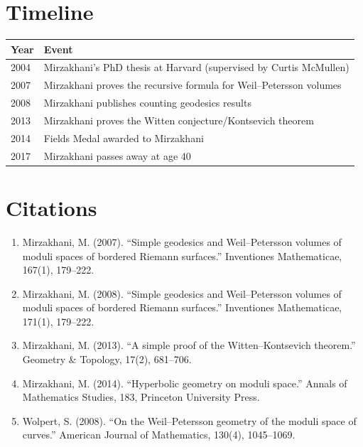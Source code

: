\section{Timeline}

\begin{tabularx}{\linewidth}{lX}
\toprule
\textbf{Year} & \textbf{Event} \\ \midrule
2004 & Mirzakhani's PhD thesis at Harvard (supervised by Curtis McMullen) \\ 
2007 & Mirzakhani proves the recursive formula for Weil--Petersson volumes \cite{mirzakhani2007} \\ 
2008 & Mirzakhani publishes counting geodesics results \cite{mirzakhani2008} \\ 
2013 & Mirzakhani proves the Witten conjecture/Kontsevich theorem \cite{mirzakhani2013} \\ 
2014 & Fields Medal awarded to Mirzakhani \\ 
2017 & Mirzakhani passes away at age 40 \\ \bottomrule
\end{tabularx}

\section{Citations}

\begin{enumerate}
\item Mirzakhani, M. (2007). ``Simple geodesics and Weil--Petersson volumes of moduli spaces of bordered Riemann surfaces.'' Inventiones Mathematicae, 167(1), 179--222.
\item Mirzakhani, M. (2008). ``Simple geodesics and Weil--Petersson volumes of moduli spaces of bordered Riemann surfaces.'' Inventiones Mathematicae, 171(1), 179--222.
\item Mirzakhani, M. (2013). ``A simple proof of the Witten--Kontsevich theorem.'' Geometry \& Topology, 17(2), 681--706.
\item Mirzakhani, M. (2014). ``Hyperbolic geometry on moduli space.'' Annals of Mathematics Studies, 183, Princeton University Press.
\item Wolpert, S. (2008). ``On the Weil--Petersson geometry of the moduli space of curves.'' American Journal of Mathematics, 130(4), 1045--1069.
\end{enumerate}